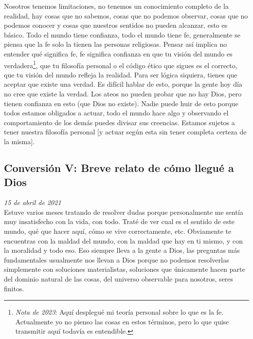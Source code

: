 \documentclass[12pt]{article}
\begin{document}
	Nosotros tenemos limitaciones, no tenemos un conocimiento completo de la
	realidad, hay cosas que no sabemos, cosas que no podemos observar,
	cosas que no podemos conocer y cosas que nuestros sentidos no pueden
	alcanzar, esto es básico. Todo el mundo tiene confianza, todo el mundo
	tiene fe, generalmente se piensa que la fe solo la tienen las personas
	religiosas. Pensar así implica no entender qué significa fe, fe
	significa confianza en que tu visión del mundo es
	verdadera\footnote{\textit{Nota de 2023}: Aquí desplegué mi teoría
	personal sobre lo que es la fe. Actualmente yo no pienso las cosas en
	estos términos, pero lo que quise transmitir aquí todavía es
	entendible.},
	que tu
	filosofía personal o el código ético que sigues es el correcto, que tu
	visión del mundo refleja la realidad. Para ser lógica siquiera, tienes
	que aceptar que existe una verdad. Es difícil hablar de esto, porque la
	gente hoy día no cree que existe la verdad. Los ateos no pueden probar
	que no hay Dios, pero tienen confianza en esto (que Dios no existe).
	Nadie puede huir de esto porque todos estamos obligados a actuar, todo
	el mundo hace algo y observando el comportamiento de los demás puedes
	divisar sus creencias. Estamos sujetos a tener nuestra filosofía
	personal [y actuar según esta sin tener completa certeza de la misma].

	\newpage

	\subsection{Conversión V: Breve relato de cómo llegué a Dios}

	\textit{15 de abril de 2021}\\

	Estuve varios meses tratando de resolver dudas porque personalmente me
	sentía muy insatisfecho con la vida, con todo. Traté
	 de ver cual es el sentido de este mundo, qué
	 que hacer aquí, cómo se vive correctamente, etc.
	Obviamente te encuentras con la maldad del mundo, con la maldad que hay
	en ti mismo, y con la moralidad y todo eso. Eso siempre lleva a la
	gente a Dios, las preguntas más fundamentales usualmente nos llevan a
	Dios porque no podemos resolverlas simplemente con soluciones
	materialistas, soluciones que únicamente hacen parte del dominio natural
	de las cosas, del universo observable para nosotros, seres finitos.
\end{document}
